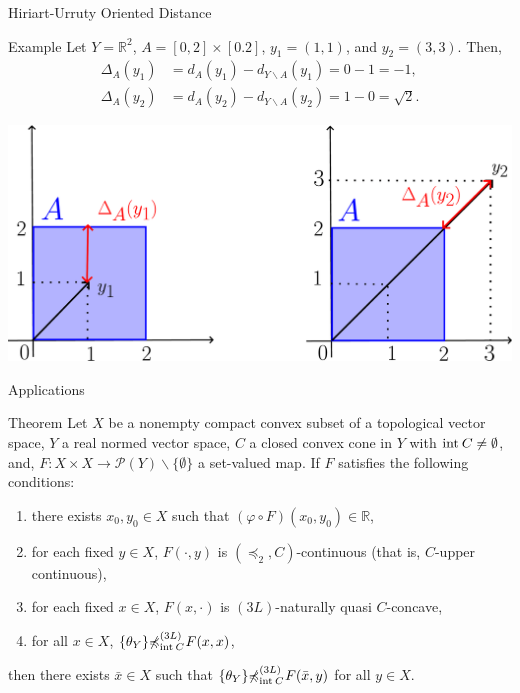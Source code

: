 \documentclass[aspectratio=169, dvipdfmx, 11pt]{beamer}
\newcommand{\RealNumberSet}{\mathbb{R}}
\newcommand{\Interior}[1]{\text{\rm int\:${#1}$}} %
\newcommand{\notsetrel}[2]{{\not\preccurlyeq}^{(#1)}_{#2}\!}
\begin{document}
\begin{frame}{Hiriart-Urruty Oriented Distance}
  \begin{exampleblock}{Example}
    Let $Y = \RealNumberSet^{2}$, $A = [0,2] \times [0.2]$, $y_{1} = (1,1)$, and $y_{2} = (3, 3)$. Then,
    \begin{align*}
      \Delta_{A}(y_{1}) & = d_{A}(y_{1}) - d_{Y \backslash A}(y_{1}) = 0 - 1 = -1,        \\
      \Delta_{A}(y_{2}) & = d_{A}(y_{2}) - d_{Y \backslash A}(y_{2}) = 1 - 0 = \sqrt{2} .
    \end{align*}
  \end{exampleblock}
  \centering
  \includegraphics[keepaspectratio, scale=0.10]{figures/eps/hiriart-urruty_distance_example.eps}
\end{frame}

\begin{frame}{Applications}
  \begin{block}{Theorem}
    Let $X$ be a nonempty compact convex subset of a topological vector space,
    $Y$ a real normed vector space, $C$ a closed convex cone in $Y$ with $\Interior{C} \ne \emptyset$,
    and, $F\colon X \times X \to \mathcal{P}(Y) \backslash \{\emptyset\}$ a set-valued map.
    If $F$ satisfies the following conditions:
    \begin{enumerate}
      \item there exists $x_0, y_0 \in X$ such that $(\varphi \circ F)(x_0,y_0) \in \RealNumberSet$,
      \item for each fixed $y \in X$, $F(\cdot,y)$ is $(\preccurlyeq_{2}, C)$-continuous (that is, $C$-upper continuous),
      \item for each fixed $x \in X$, $F(x,\cdot)$ is $(3L)$-naturally quasi $C$-concave,
      \item for all $x \in X$, $\{\theta_Y\} \notsetrel{3L}{\Interior{C}}\: F(x,x)$,
    \end{enumerate}
    then there exists $\bar{x} \in X$ such that $\{\theta_{Y}\} \notsetrel{3L}{\Interior{C}}\: F(\bar{x},y)$ for all $y \in X$.
  \end{block}
\end{frame}
\end{document}
